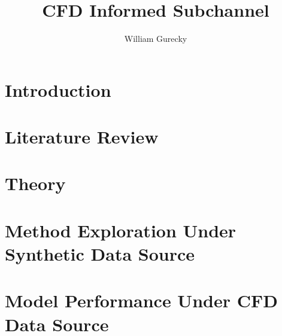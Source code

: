 \documentclass[12pt,a4paper]{report}
\author{William Gurecky}
\title{CFD Informed Subchannel}
\begin{document}








\onehalfspacing
\chapter{Introduction}
\label{chap:intro}


\chapter{Literature Review}
\label{chap:lit}


\chapter{Theory}
\label{chap:theory}


\chapter{Method Exploration Under Synthetic Data Source}
\label{chap:work}



\chapter{Model Performance Under CFD Data Source}
\label{chap:fw}


\end{document}
